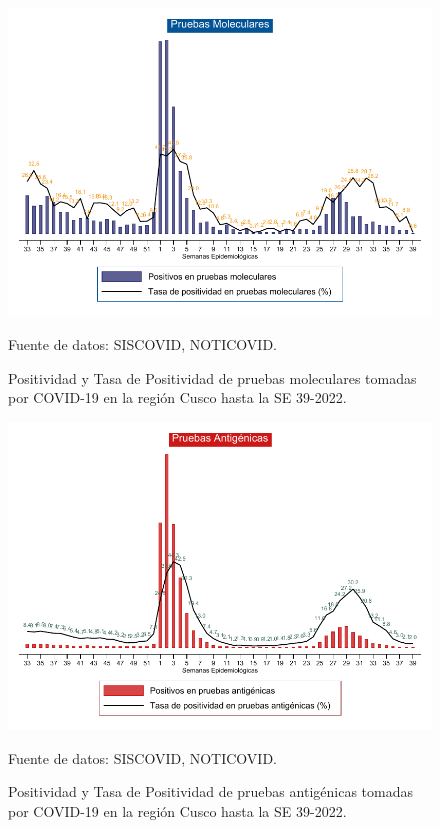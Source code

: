 \documentclass[12pt,a4paper,openany]{book}
\begin{document}
	
	\begin{landscape}
		\begin{figure}[h]
			\caption{Positividad y Tasa de Positividad de pruebas moleculares tomadas por COVID-19 en la región Cusco hasta la SE 39-2022.}\label{fig:positividad_pcr}
			\begin{center}
				\includegraphics[width=0.90\linewidth]{../figuras/positividad_pcr.pdf}
			\end{center}
			{\footnotesize {Fuente de datos: SISCOVID, NOTICOVID.}}
		\end{figure}
	\end{landscape}
	\clearpage
	\begin{landscape}
		
		\begin{figure}[h]
			\caption{ Positividad y Tasa de Positividad de pruebas antigénicas tomadas por COVID-19 en la región Cusco hasta la SE 39-2022.}\label{fig:positividad_ag}
			\begin{center}
				\includegraphics[width=0.90\linewidth]{../figuras/positividad_ag.pdf}
			\end{center}
			{\footnotesize {Fuente de datos: SISCOVID, NOTICOVID.}}
		\end{figure}
	\end{landscape}
\end{document}
